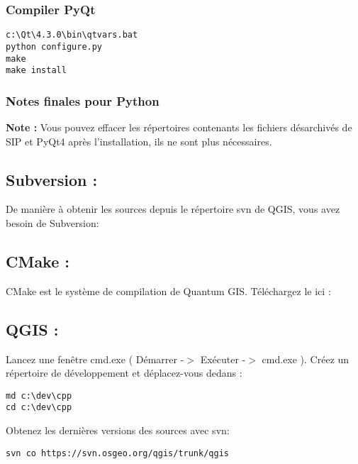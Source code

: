 \subsubsection{Compiler PyQt}
\begin{verbatim}
c:\Qt\4.3.0\bin\qtvars.bat 
python configure.py 
make 
make install 
\end{verbatim}

\subsubsection{Notes finales pour Python}

\textbf{Note :} Vous pouvez effacer les répertoires contenants les fichiers désarchivés de SIP et PyQt4 après l'installation, ils ne sont plus nécessaires.

\subsection{Subversion :}
De manière à obtenir les sources depuis le répertoire svn de QGIS, vous avez besoin de Subversion:


\subsection{CMake :}
CMake est le système de compilation de Quantum GIS. Téléchargez le ici :


\subsection{QGIS :}
Lancez une fenêtre cmd.exe ( Démarrer -$>$ Exécuter -$>$ cmd.exe ). Créez un répertoire de développement et déplacez-vous dedans :

\begin{verbatim}
md c:\dev\cpp 
cd c:\dev\cpp 
\end{verbatim}

Obtenez les dernières versions des sources avec svn:

\begin{verbatim}
svn co https://svn.osgeo.org/qgis/trunk/qgis 
\end{verbatim}


